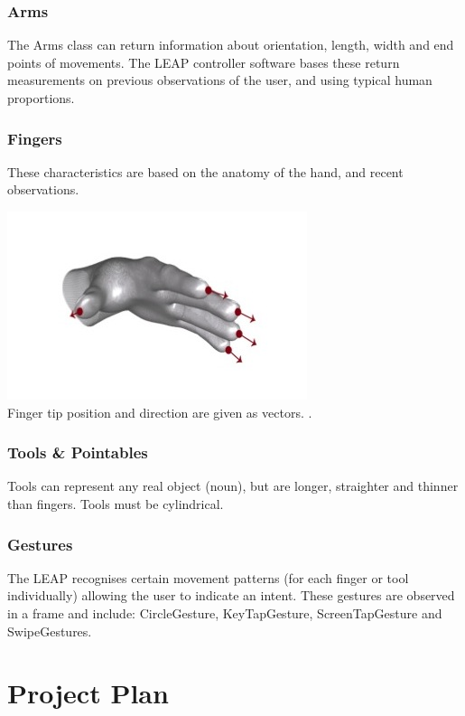 \documentclass[10pt]{article}
\begin{document}
\subsubsection{Arms}
The Arms class can return information about orientation, length, width and end points of movements. The LEAP controller software bases these return measurements on previous observations of the user, and using typical human proportions.

\subsubsection{Fingers}
These characteristics are based on the anatomy of the hand, and recent observations. 

\begin{center}
\includegraphics[scale=0.7]{fingers}\\
Finger tip position and direction are given as vectors. \cite{leap}.
\end{center}


\subsubsection{Tools \& Pointables}
Tools can represent any real object (noun), but are longer, straighter and thinner than fingers. Tools must be cylindrical.

\subsubsection{Gestures}
The LEAP recognises certain movement patterns (for each finger or tool individually) allowing the user to indicate an intent. These gestures are observed in a frame and include: CircleGesture, KeyTapGesture, ScreenTapGesture and SwipeGestures.


\section{Project Plan}\label{plan}
\end{document}
